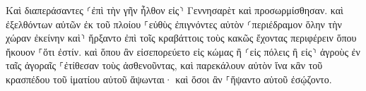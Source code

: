 \documentclass{openreader}
\begin{document}
Καὶ διαπεράσαντες ⸂ἐπὶ τὴν γῆν ἦλθον εἰς⸃ Γεννησαρὲτ καὶ προσωρμίσθησαν. 
καὶ ἐξελθόντων αὐτῶν ἐκ τοῦ πλοίου ⸀εὐθὺς ἐπιγνόντες αὐτὸν 
⸂περιέδραμον ὅλην τὴν χώραν ἐκείνην καὶ⸃ ἤρξαντο ἐπὶ τοῖς κραβάττοις τοὺς κακῶς ἔχοντας περιφέρειν ὅπου ἤκουον ⸀ὅτι ἐστίν. 
καὶ ὅπου ἂν εἰσεπορεύετο εἰς κώμας ἢ ⸂εἰς πόλεις ἢ εἰς⸃ ἀγροὺς ἐν ταῖς ἀγοραῖς ⸀ἐτίθεσαν τοὺς ἀσθενοῦντας, καὶ παρεκάλουν αὐτὸν ἵνα κἂν τοῦ κρασπέδου τοῦ ἱματίου αὐτοῦ ἅψωνται· καὶ ὅσοι ἂν ⸀ἥψαντο αὐτοῦ ἐσῴζοντο. 
\end{document}
